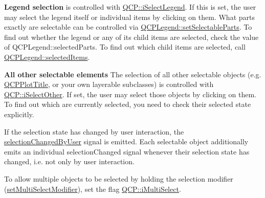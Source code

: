 {\bfseries \-Legend selection} is controlled with \hyperlink{namespaceQCP_a2ad6bb6281c7c2d593d4277b44c2b037a269c9af298e257d1108edec0432b5513}{\-Q\-C\-P\-::i\-Select\-Legend}. \-If this is set, the user may select the legend itself or individual items by clicking on them. \-What parts exactly are selectable can be controlled via \hyperlink{classQCPLegend_a9ce60aa8bbd89f62ae4fa83ac6c60110}{\-Q\-C\-P\-Legend\-::set\-Selectable\-Parts}. \-To find out whether the legend or any of its child items are selected, check the value of \-Q\-C\-P\-Legend\-::selected\-Parts. \-To find out which child items are selected, call \hyperlink{classQCPLegend_ac93eaf236e911d67aa8b88942ef45c5e}{\-Q\-C\-P\-Legend\-::selected\-Items}.

{\bfseries \-All other selectable elements} \-The selection of all other selectable objects (e.\-g. \hyperlink{classQCPPlotTitle}{\-Q\-C\-P\-Plot\-Title}, or your own layerable subclasses) is controlled with \hyperlink{namespaceQCP_a2ad6bb6281c7c2d593d4277b44c2b037af67a50bc26147a13b551b3a625374949}{\-Q\-C\-P\-::i\-Select\-Other}. \-If set, the user may select those objects by clicking on them. \-To find out which are currently selected, you need to check their selected state explicitly.

\-If the selection state has changed by user interaction, the \hyperlink{classQCustomPlot_a500c64a109bc773c973ad274f2fa4190}{selection\-Changed\-By\-User} signal is emitted. \-Each selectable object additionally emits an individual selection\-Changed signal whenever their selection state has changed, i.\-e. not only by user interaction.

\-To allow multiple objects to be selected by holding the selection modifier (\hyperlink{classQCustomPlot_a8fc96e3b5138a06759a2a90c166df516}{set\-Multi\-Select\-Modifier}), set the flag \hyperlink{namespaceQCP_a2ad6bb6281c7c2d593d4277b44c2b037aef673112c5067c3cf4cfddb62da7265d}{\-Q\-C\-P\-::i\-Multi\-Select}.


